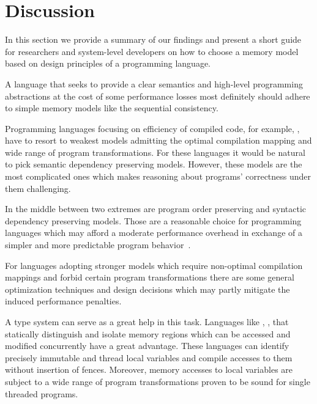 \section{Discussion}
\label{sec:discussion}

In this section we provide a summary of our findings
and present a short guide for researchers and system-level developers 
on how to choose a memory model based on 
design principles of a programming language.   

A language that seeks to provide a clear semantics and 
high-level programming abstractions at the cost 
of some performance losses most definitely should 
adhere to simple memory models like the sequential consistency. 

Programming languages focusing on efficiency 
of compiled code, for example, \CPP, 
have to resort to weakest models admitting 
the optimal compilation mapping 
and wide range of program transformations. 
For these languages it would be natural 
to pick semantic dependency preserving models.
However, these models are the most complicated ones
which makes reasoning about programs' correctness under them challenging.

In the middle between two extremes are program order preserving and 
syntactic dependency preserving models.
Those are a reasonable choice for programming languages
which may afford a moderate performance overhead 
in exchange of a simpler and more predictable program behavior~\cite{Ou-Demsky:OOPSLA18}.

For languages adopting stronger models which require non-optimal
compilation mappings and forbid certain program transformations
there are some general optimization techniques and design decisions
which may partly mitigate the induced performance penalties.

A type system can serve as a great help in this task. 
Languages like \Haskell, \OCaml, \Rust that 
statically distinguish and isolate memory regions 
which can be accessed and modified concurrently have a great advantage.
These languages can identify precisely 
immutable and thread local variables
and compile accesses to them without insertion of fences.
Moreover, memory accesses to local variables are subject to 
a wide range of program transformations proven to be
sound for single threaded programs. 
 
